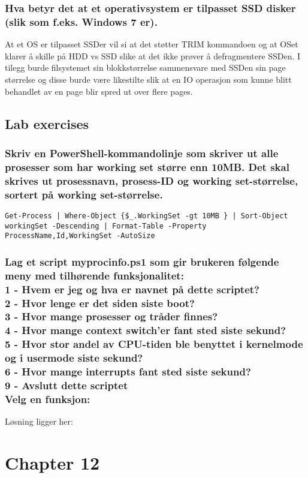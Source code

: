 \documentclass[9pt]{article}
\begin{document}
\subsubsection{Hva betyr det at et operativsystem er tilpasset SSD disker (slik som f.eks. Windows 7 er).}

At et OS er tilpasset SSDer vil si at det støtter TRIM kommandoen og at OSet klarer å skille på HDD vs SSD slike at det ikke prøver å defragmentere SSDen. I tilegg burde filsystemet sin blokkstørrelse sammensvare med SSDen sin page størrelse og disse burde være likestilte slik at en IO operasjon som kunne blitt behandlet av en page blir spred ut over flere pages.
\subsection{Lab exercises}
\subsubsection{Skriv en PowerShell-kommandolinje som skriver ut alle prosesser som har working set større enn 10MB. Det skal skrives ut prosessnavn, prosess-ID og working set-størrelse, sortert på working set-størrelse.}
\begin{lstlisting}[breaklines]
Get-Process | Where-Object {$_.WorkingSet -gt 10MB } | Sort-Object workingSet -Descending | Format-Table -Property ProcessName,Id,WorkingSet -AutoSize
\end{lstlisting}
\subsubsection{Lag et script myprocinfo.ps1 som gir brukeren følgende meny med tilhørende funksjonalitet: \\
1 - Hvem er jeg og hva er navnet på dette scriptet? \\
2 - Hvor lenge er det siden siste boot? \\
3 - Hvor mange prosesser og tråder finnes? \\
4 - Hvor mange context switch'er fant sted siste sekund? \\
5 - Hvor stor andel av CPU-tiden ble benyttet i kernelmode og i usermode siste sekund? \\
6 - Hvor mange interrupts fant sted siste sekund? \\
9 - Avslutt dette scriptet \\
Velg en funksjon:
}

Løsning ligger her: 
\section{Chapter 12}
\setcounter{subsection}{2}
\end{document}
